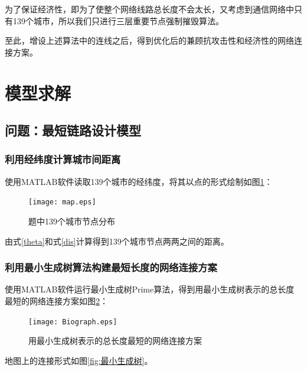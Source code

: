 \documentclass{article}
\begin{document}
为了保证经济性，即为了使整个网络线路总长度不会太长，又考虑到通信网络中只有139个城市，所以我们只进行三层重要节点强制摧毁算法。

至此，增设上述算法中的连线之后，得到优化后的兼顾抗攻击性和经济性的网络连接方案。

\newpage

\section{模型求解}%
\label{sec:模型求解}

\subsection{问题：最短链路设计模型}
\label{sub:问题\chinese{subsection}：最短链路设计模型}

\subsubsection{利用经纬度计算城市间距离}
\label{ssub:利用经纬度计算城市间距离}

使用MATLAB软件读取139个城市的经纬度，将其以点的形式绘制如图\ref{all}：

\begin{figure}[htpb]
	\centering
	\texttt{[image: map.eps]}
	\caption{题中139个城市节点分布} \label{all}
\end{figure}

由式\ref{theta}和式\ref{dis}计算得到139个城市节点两两之间的距离。

\subsubsection{利用最小生成树算法构建最短长度的网络连接方案}
\label{ssub:利用最小生成树算法构建最短长度的网络连接方案}

使用MATLAB软件运行最小生成树Prime算法，得到用最小生成树表示的总长度最短的网络连接方案如图\ref{shorttree}：


\begin{figure}[htpb]
	\centering
	\texttt{[image: Biograph.eps]}
	\caption{用最小生成树表示的总长度最短的网络连接方案} \label{shorttree}
\end{figure}

\restoregeometry

地图上的连接形式如图\ref{fig:最小生成树}。
\end{document}
